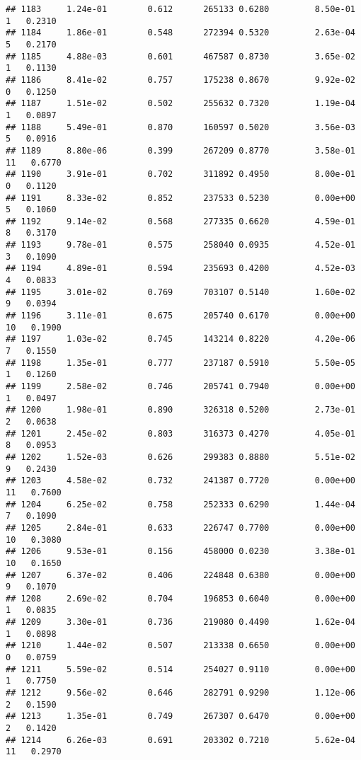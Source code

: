 \documentclass[
]{article}
\begin{document}
\begin{verbatim}
## 1183     1.24e-01        0.612      265133 0.6280         8.50e-01   1   0.2310
## 1184     1.86e-01        0.548      272394 0.5320         2.63e-04   5   0.2170
## 1185     4.88e-03        0.601      467587 0.8730         3.65e-02   1   0.1130
## 1186     8.41e-02        0.757      175238 0.8670         9.92e-02   0   0.1250
## 1187     1.51e-02        0.502      255632 0.7320         1.19e-04   1   0.0897
## 1188     5.49e-01        0.870      160597 0.5020         3.56e-03   5   0.0916
## 1189     8.80e-06        0.399      267209 0.8770         3.58e-01  11   0.6770
## 1190     3.91e-01        0.702      311892 0.4950         8.00e-01   0   0.1120
## 1191     8.33e-02        0.852      237533 0.5230         0.00e+00   5   0.1060
## 1192     9.14e-02        0.568      277335 0.6620         4.59e-01   8   0.3170
## 1193     9.78e-01        0.575      258040 0.0935         4.52e-01   3   0.1090
## 1194     4.89e-01        0.594      235693 0.4200         4.52e-03   4   0.0833
## 1195     3.01e-02        0.769      703107 0.5140         1.60e-02   9   0.0394
## 1196     3.11e-01        0.675      205740 0.6170         0.00e+00  10   0.1900
## 1197     1.03e-02        0.745      143214 0.8220         4.20e-06   7   0.1550
## 1198     1.35e-01        0.777      237187 0.5910         5.50e-05   1   0.1260
## 1199     2.58e-02        0.746      205741 0.7940         0.00e+00   1   0.0497
## 1200     1.98e-01        0.890      326318 0.5200         2.73e-01   2   0.0638
## 1201     2.45e-02        0.803      316373 0.4270         4.05e-01   8   0.0953
## 1202     1.52e-03        0.626      299383 0.8880         5.51e-02   9   0.2430
## 1203     4.58e-02        0.732      241387 0.7720         0.00e+00  11   0.7600
## 1204     6.25e-02        0.758      252333 0.6290         1.44e-04   7   0.1090
## 1205     2.84e-01        0.633      226747 0.7700         0.00e+00  10   0.3080
## 1206     9.53e-01        0.156      458000 0.0230         3.38e-01  10   0.1650
## 1207     6.37e-02        0.406      224848 0.6380         0.00e+00   9   0.1070
## 1208     2.69e-02        0.704      196853 0.6040         0.00e+00   1   0.0835
## 1209     3.30e-01        0.736      219080 0.4490         1.62e-04   1   0.0898
## 1210     1.44e-02        0.507      213338 0.6650         0.00e+00   0   0.0759
## 1211     5.59e-02        0.514      254027 0.9110         0.00e+00   1   0.7750
## 1212     9.56e-02        0.646      282791 0.9290         1.12e-06   2   0.1590
## 1213     1.35e-01        0.749      267307 0.6470         0.00e+00   2   0.1420
## 1214     6.26e-03        0.691      203302 0.7210         5.62e-04  11   0.2970

\end{verbatim}
\end{document}
